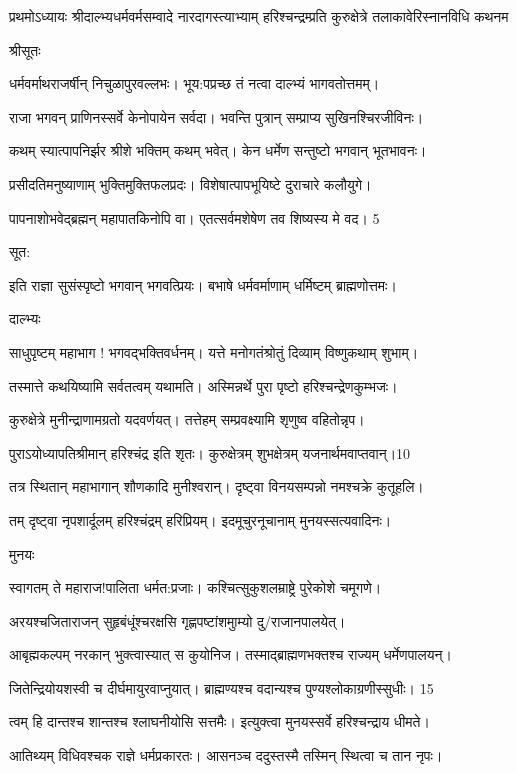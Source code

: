 प्रथमोऽध्यायः
श्रीदाल्भ्यधर्मवर्मसम्वादे नारदागस्त्याभ्याम् 
हरिश्चन्द्रम्प्रति कुरुक्षेत्रे 
तलाकावेरिस्नानविधि कथनम 

श्रीसूतः

धर्मवर्माथराजर्षीन् निचुळापुरवल्लभः।
भूय:पप्रच्छ तं नत्वा दाल्भ्यं भागवतोत्तमम्।

राजा भगवन् प्राणिनस्सर्वे केनोपायेन सर्वदा।
भवन्ति पुत्रान् सम्प्राप्य सुखिनश्चिरजीविनः।

कथम् स्यात्पापनिर्झर श्रीशे भक्तिम् कथम् भवेत्।
केन धर्मेण सन्तुष्टो भगवान् भूतभावनः।

प्रसीदतिमनुष्याणाम् भुक्तिमुक्तिफलप्रदः।
विशेषात्पापभूयिष्टे दुराचारे कलौयुगे।

पापनाशोभवेद्ब्रह्मन् महापातकिनोपि वा।
एतत्सर्वमशेषेण तव शिष्यस्य मे वद। 5 

सूत:

इति राज्ञा सुसंस्पृष्टो भगवान् भगवत्प्रियः।
बभाषे धर्मवर्माणाम् धर्मिष्टम् ब्राह्मणोत्तमः। 

दाल्भ्यः 

साधुपृष्टम् महाभाग ! भगवद्भक्तिवर्धनम्।
यत्ते मनोगतंश्रोतुं दिव्याम् विष्णुकथाम् शुभाम्।

तस्मात्ते कथयिष्यामि सर्वतत्वम् यथामति।
अस्मिन्नर्थे पुरा पृष्टो हरिश्चन्द्रेणकुम्भजः।

कुरुक्षेत्रे मुनीन्द्राणामग्रतो यदवर्णयत्।
तत्तेहम् सम्प्रवक्ष्यामि शृणुष्व वहितोन्नृप।

पुराऽयोध्यापतिश्रीमान् हरिश्चंद्र इति शृतः।
कुरुक्षेत्रम् शुभक्षेत्रम् यजनार्थमवाप्तवान्।10

तत्र स्थितान् महाभागान् शौणकादि मुनीश्वरान्।
दृष्ट्वा विनयसम्पन्नो नमश्चक्रे कुतूहलि।

तम् दृष्ट्वा नृपशार्दूलम् हरिश्चंद्रम् हरिप्रियम्।
इदमूचुरनूचानाम् मुनयस्सत्यवादिनः।

मुनयः

स्वागतम् ते महाराज!पालिता धर्मत:प्रजाः।
कश्चित्सुकुशलम्राष्ट्रे पुरेकोशे चमूगणे।

अरयश्चजिताराजन् सुहृबंधूंश्चरक्षसि
गृह्णपष्टांशमुाम्यो दु/राजानपालयेत्।

आबृह्मकल्पम् नरकान् भुक्त्वास्यात् स कुयोनिज।
तस्माद्ब्राह्मणभक्तश्च राज्यम् धर्मेणपालयन्।

जितेन्द्रियोयशस्वी च दीर्घमायुरवाप्नुयात्।
ब्राह्मण्यश्च वदान्यश्च पुण्यश्लोकाग्रणीस्सुधीः। 15

त्वम् हि दान्तश्च शान्तश्च श्लाघनीयोसि सत्तमैः।
इत्युक्त्वा मुनयस्सर्वे हरिश्चन्द्राय धीमते।

आतिथ्यम् विधिवश्चक राज्ञे धर्मप्रकारतः।
आसनञ्च ददुस्तस्मै तस्मिन् स्थित्वा च तान नृपः।

